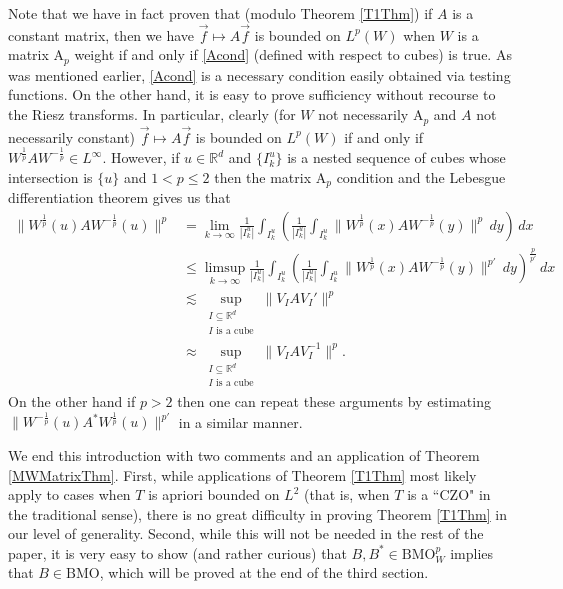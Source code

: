 \documentclass[12pt,reqno ]{amsart}
\numberwithin{equation}{section}
\theoremstyle{definition}
\newcommand{\Rd}{\ensuremath{\mathbb{R}^d}}
\newcommand{\BMOW}{\ensuremath{{\text{BMO}}_W ^p}}
\begin{document}
Note that we have in fact proven that (modulo Theorem \ref{T1Thm}) if $A$ is a constant matrix, then we have $\vec{f} \mapsto A \vec{f}$ is bounded on $L^p(W)$ when $W$ is a matrix A${}_p$ weight if and only if \eqref{Acond} (defined with respect to cubes) is true. As was mentioned earlier, \eqref{Acond} is a necessary condition easily obtained via testing functions.  On the other hand, it is easy to prove sufficiency without recourse to the Riesz transforms.  In particular, clearly (for $W$ not necessarily A${}_p$ and $A$ not necessarily constant)  $\vec{f} \mapsto A \vec{f}$ is bounded on $L^p(W)$ if and only if $W^{\frac{1}{p}} A W^{-\frac{1}{p}} \in L^\infty$.   However, if $u \in \Rd$ and $\{I_{k} ^{u}\}$ is a nested sequence of cubes whose intersection is $\{u\}$ and $1 < p \leq 2$ then the matrix A${}_p$ condition and the Lebesgue differentiation theorem gives us that \begin{align*} \|W^\frac{1}{p} (u) A W^{-\frac{1}{p}} (u) \|^{p} & = \lim_{k \rightarrow \infty} \frac{1}{|I_{k} ^{u}|} \int_{I_{k} ^{u}} \left(\frac{1}{|I_{k} ^{u}|} \int_{I_{k} ^{u}} \|W^\frac{1}{p} (x) A W^{-\frac{1}{p}} (y) \|^{p} \, dy \right) \, dx \\ & \leq \limsup_{k \rightarrow \infty} \frac{1}{|I_{k} ^{u}|} \int_{I_{k} ^{u}} \left(\frac{1}{|I_{k} ^{u}|} \int_{I_{k} ^{u}} \|W^\frac{1}{p} (x) A W^{-\frac{1}{p}} (y) \|^{p'} \, dy \right)^\frac{p}{p'} \, dx \\ & \lesssim \sup_{\substack{ I \subseteq \Rd \\ I \text{ is a cube}}}  \|V_I A V_I ' \| ^p \\ & \approx \sup_{\substack{ I \subseteq \Rd \\ I \text{ is a cube}}}  \|V_I A V_I ^{-1} \| ^p. \end{align*}  On the other hand if $p > 2$ then one can repeat these arguments by estimating  $\|W^{-\frac{1}{p}} (u) A^* W^{\frac{1}{p}} (u) \|^{p'}$ in a similar manner.

We end this introduction with two comments and an application of Theorem \ref{MWMatrixThm}.   First, while applications of Theorem \ref{T1Thm} most likely apply to cases when $T$ is apriori bounded on $L^2$ (that is, when $T$ is a ``CZO" in the traditional sense), there is no great difficulty in proving Theorem \ref{T1Thm} in our level of generality.  Second,  while this will not be needed in the rest of the paper, it is very easy to show (and rather curious) that $B, B^* \in \BMOW$ implies that $B \in \text{BMO}$, which will be proved at the end of the third section.
\end{document}
